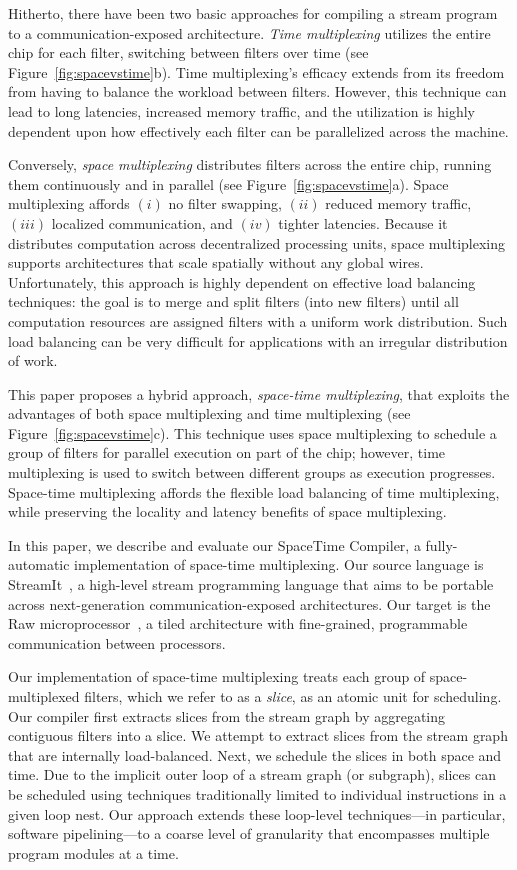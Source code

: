 Hitherto, there have been two basic approaches for compiling a stream
program to a communication-exposed architecture.  {\it Time
multiplexing} utilizes the entire chip for each filter, switching
between filters over time (see Figure~\ref{fig:spacevstime}b).  Time
multiplexing's efficacy extends from its freedom from having to
balance the workload between filters.  However, this technique can
lead to long latencies, increased memory traffic, and the utilization
is highly dependent upon how effectively each filter can be
parallelized across the machine.

Conversely, {\it space multiplexing} distributes filters across the
entire chip, running them continuously and in parallel (see
Figure~\ref{fig:spacevstime}a).  Space multiplexing affords $(i)$ no
filter swapping, $(ii)$ reduced memory traffic, $(iii)$ localized
communication, and $(iv)$ tighter latencies.  Because it distributes
computation across decentralized processing units, space multiplexing
supports architectures that scale spatially without any global wires.
Unfortunately, this approach is highly dependent on effective load
balancing techniques: the goal is to merge and split filters (into new
filters) until all computation resources are assigned filters with a
uniform work distribution.  Such load balancing can be very difficult
for applications with an irregular distribution of work.

This paper proposes a hybrid approach, {\it space-time multiplexing},
that exploits the advantages of both space multiplexing and time
multiplexing (see Figure~\ref{fig:spacevstime}c).  This technique uses
space multiplexing to schedule a group of filters for parallel
execution on part of the chip; however, time multiplexing is used to
switch between different groups as execution progresses.  Space-time
multiplexing affords the flexible load balancing of time multiplexing,
while preserving the locality and latency benefits of space
multiplexing.

In this paper, we describe and evaluate our SpaceTime Compiler, a
fully-automatic implementation of space-time multiplexing.  Our source
language is StreamIt~\cite{streamitcc}, a high-level stream
programming language that aims to be portable across next-generation
communication-exposed architectures.  Our target is the Raw
microprocessor~\cite{raw10,raw_isca}, a tiled architecture with
fine-grained, programmable communication between processors.

Our implementation of space-time multiplexing treats each group of
space-multiplexed filters, which we refer to as a {\it slice}, as an
atomic unit for scheduling. Our compiler first extracts slices from
the stream graph by aggregating contiguous filters into a slice. We
attempt to extract slices from the stream graph that are internally
load-balanced. Next, we schedule the slices in both space and time.
Due to the implicit outer loop of a stream graph (or
subgraph), slices can be scheduled using techniques traditionally
limited to individual instructions in a given loop nest.  Our approach
extends these loop-level techniques---in particular, software
pipelining---to a coarse level of granularity that encompasses
multiple program modules at a time.

